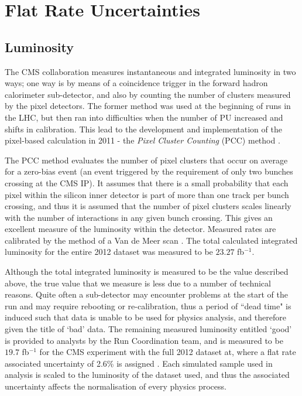 
\section{Flat Rate Uncertainties} \label{sec-FlateRateUncertainties}

\subsection{Luminosity} \label{subsec-Luminosity}

The CMS collaboration measures instantaneous and integrated luminosity in two ways; one way is by means of a coincidence trigger in the forward hadron calorimeter sub-detector, and also by counting the number of clusters measured by the pixel detectors. The former method was used at the beginning of runs in the LHC, but then ran into difficulties when the number of PU increased and shifts in calibration. This lead to the development and implementation of the pixel-based calculation in 2011 - the \emph{Pixel Cluster Counting} (PCC) method \cite{cmslumiwinter2012}.

The PCC method evaluates the number of pixel clusters that occur on average for a zero-bias event (an event triggered by the requirement of only two bunches crossing at the CMS IP). It assumes that there is a small probability that each pixel within the silicon inner detector is part of more than one track per bunch crossing, and thus it is assumed that the number of pixel clusters scales linearly with the number of interactions in any given bunch crossing. This gives an excellent measure of the luminosity within the detector. Measured rates are calibrated by the method of a Van de Meer scan \cite{White:1357865}. The total calculated integrated luminosity for the entire 2012 dataset was measured to be $23.27$ fb$^{-1}$.

Although the total integrated luminosity is measured to be the value described above, the true value that we measure is less due to a number of technical reasons. Quite often a sub-detector may encounter problems at the start of the run and may require rebooting or re-calibration, thus a period of ``dead time" is induced such that data is unable to be used for physics analysis, and therefore given the title of `bad' data. The remaining measured luminosity entitled `good' is provided to analysts by the Run Coordination team, and is measured to be $19.7$ fb$^{-1}$ for the CMS experiment with the full 2012 dataset at, where a flat rate associated uncertainty of 2.6\% is assigned \cite{CMS-PAS-LUM-13-001}. Each simulated sample used in analysis is scaled to the luminosity of the dataset used, and thus the associated uncertainty affects the normalisation of every physics process.

